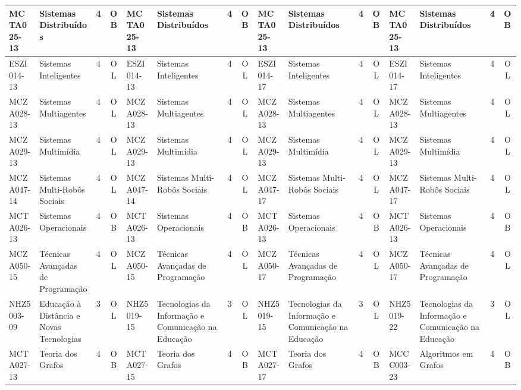 \documentclass[a4paper]{article}
\begin{document}
\begin{landscape}
{\begin{longtable}{|l|p{.15\textheight}|c|c||l|p{.15\textheight}|c|c||l|p{.15\textheight}|c|c||l|p{.15\textheight}|c|c|}
    MCTA025-13 & Sistemas Distribuídos & 4 & OB &
    MCTA025-13 & Sistemas Distribuídos & 4 & OB &
    MCTA025-13 & Sistemas Distribuídos & 4 & OB &
    MCTA025-13 & Sistemas Distribuídos & 4 & OB\\ \hline

    ESZI014-13 & Sistemas Inteligentes & 4 & OL &
    ESZI014-13 & Sistemas Inteligentes & 4 & OL &
    ESZI014-17 & Sistemas Inteligentes & 4 & OL & 
    ESZI014-17 & Sistemas Inteligentes & 4 & OL \\ \hline

    MCZA028-13 & Sistemas Multiagentes & 4 & OL &
    MCZA028-13 & Sistemas Multiagentes & 4 & OL &
    MCZA028-13 & Sistemas Multiagentes & 4 & OL &
    MCZA028-13 & Sistemas Multiagentes & 4 & OL \\ \hline

    MCZA029-13 & Sistemas Multimídia & 4 & OL &
    MCZA029-13 & Sistemas Multimídia & 4 & OL &
    MCZA029-13 & Sistemas Multimídia & 4 & OL &
    MCZA029-13 & Sistemas Multimídia & 4 & OL \\ \hline

    MCZA047-14 & Sistemas Multi-Robôs Sociais & 4 & OL &
    MCZA047-14 & Sistemas Multi-Robôs Sociais & 4 & OL &
    MCZA047-17 & Sistemas Multi-Robôs Sociais & 4 & OL &
    MCZA047-17 & Sistemas Multi-Robôs Sociais & 4 & OL \\ \hline
   
    MCTA026-13 & Sistemas Operacionais & 4 & OB & 
    MCTA026-13 & Sistemas Operacionais & 4 & OB & 
    MCTA026-13 & Sistemas Operacionais & 4 & OB & 
    MCTA026-13 & Sistemas Operacionais & 4 & OB \\ \hline

    MCZA050-15 & Técnicas Avançadas de Programação & 4 & OL &
    MCZA050-15 & Técnicas Avançadas de Programação & 4 & OL &
    MCZA050-17 & Técnicas Avançadas de Programação & 4 & OL &
    MCZA050-17 & Técnicas Avançadas de Programação & 4 & OL \\ \hline

    NHZ5003-09 & Educação à Distância e Novas Tecnologias & 3 & OL &
    NHZ5019-15 & Tecnologias da Informação e Comunicação na Educação & 3 & OL &
    NHZ5019-15 & Tecnologias da Informação e Comunicação na Educação & 3 & OL &
    NHZ5019-22 & Tecnologias da Informação e Comunicação na Educação & 3 & OL \\ \hline

    MCTA027-13 & Teoria dos Grafos & 4 & OB &
    MCTA027-15 & Teoria dos Grafos & 4 & OB &
    MCTA027-17 & Teoria dos Grafos & 4 & OB &
    MCCC003-23 & Algoritmos em Grafos & 4 & OB\\ \hline


\end{longtable}}
\end{landscape}
\end{document}
